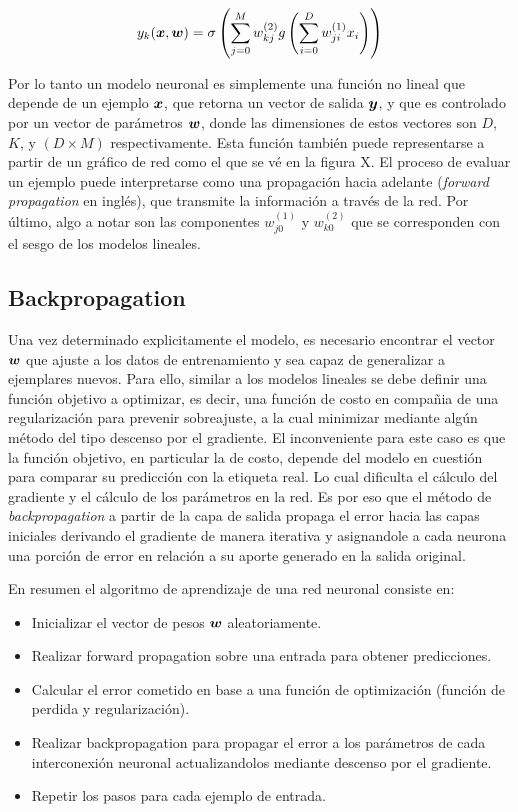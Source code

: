 \begin{equation}
    y_k(\boldsymbol{x}, \boldsymbol{w}) = \sigma\left(
                \sum_{j=0}^{M} w_{kj}^{(2)}
                    g\left( \sum_{i = 0}^{D} w_{ji}^{(1)} x_{i}
                \right)
            \right)
\end{equation}

Por lo tanto un modelo neuronal es simplemente una función no lineal que depende
de un ejemplo $\boldsymbol{x}$, que retorna un vector de salida $\boldsymbol{y}$, y que es
controlado por un vector de parámetros $\boldsymbol{w}$, donde las dimensiones de
estos vectores son $D$, $K$, y $(D \times M)$ respectivamente. Esta función
también puede representarse a partir de un gráfico de red como el que se vé en
la figura X. El proceso de evaluar un ejemplo puede interpretarse como una
propagación hacia adelante (\emph{forward propagation} en inglés), que transmite
la información a través de la red. Por último, algo a notar son las componentes
$w_{j0}^{(1)}$ y $w_{k0}^{(2)}$ que se corresponden con el sesgo de los modelos
lineales.

\subsection{Backpropagation}

Una vez determinado explicitamente el modelo, es necesario encontrar el vector
$\boldsymbol{w}$ que ajuste a los datos de entrenamiento y sea capaz de generalizar a
ejemplares nuevos. Para ello, similar a los modelos lineales se debe definir una
función objetivo a optimizar, es decir, una función de costo en compañia de una
regularización para prevenir sobreajuste, a la cual minimizar mediante algún
método del tipo descenso por el gradiente. El inconveniente para este caso es
que la función objetivo, en particular la de costo, depende del modelo en
cuestión para comparar su predicción con la etiqueta real. Lo cual dificulta el
cálculo del gradiente y el cálculo de los parámetros en la red. Es por eso que
el método de \emph{backpropagation} a partir de la capa de salida propaga el
error hacia las capas iniciales derivando el gradiente de manera iterativa y
asignandole a cada neurona una porción de error en relación a su aporte generado
en la salida original.

En resumen el algoritmo de aprendizaje de una red neuronal consiste en:

\begin{itemize}
    \item Inicializar el vector de pesos $\boldsymbol{w}$ aleatoriamente.
    \item Realizar forward propagation sobre una entrada para obtener
    predicciones.
    \item Calcular el error cometido en base a una función de optimización
    (función de perdida y regularización).
    \item Realizar backpropagation para propagar el error a los parámetros de
    cada interconexión neuronal actualizandolos mediante descenso por el gradiente.
    \item Repetir los pasos para cada ejemplo de entrada.
\end{itemize}


